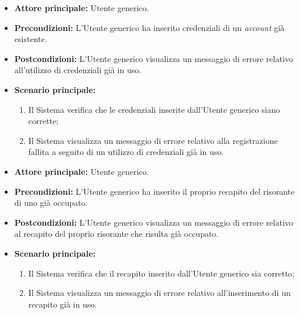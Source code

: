 \label{usecase:Errore registrazione account esistente}
\begin{itemize}

	\item \textbf{Attore principale:} Utente generico.

	\item \textbf{Precondizioni:} L'Utente generico ha inserito credenziali di un \textit{account} già esistente.

	\item \textbf{Postcondizioni:} L'Utente generico visualizza un messaggio di errore relativo all'utilizzo di credenziali già in uso.

	\item \textbf{Scenario principale:}
	\begin{enumerate}
        \item Il Sistema verifica che le credenziali inserite dall'Utente generico siano corrette;
        \item Il Sistema visualizza un messaggio di errore relativo alla registrazione fallita a seguito di un utilizzo di credenziali già in uso.
	\end{enumerate}
	
\end{itemize}

\label{usecase:Errore registrazione recapito occupato}
\begin{itemize}

	\item \textbf{Attore principale:} Utente generico.

	\item \textbf{Precondizioni:} L'Utente generico ha inserito il proprio recapito del risorante di uno già occupato.
	
	\item \textbf{Postcondizioni:} L'Utente generico visualizza un messaggio di errore relativo al recapito del proprio risorante che risulta già occupato.

	\item \textbf{Scenario principale:}
	\begin{enumerate}
        \item Il Sistema verifica che il recapito inserito dall'Utente generico sia corretto;
        \item Il Sistema visualizza un messaggio di errore relativo all'inserimento di un recapito già in uso.
	\end{enumerate}
	
\end{itemize}